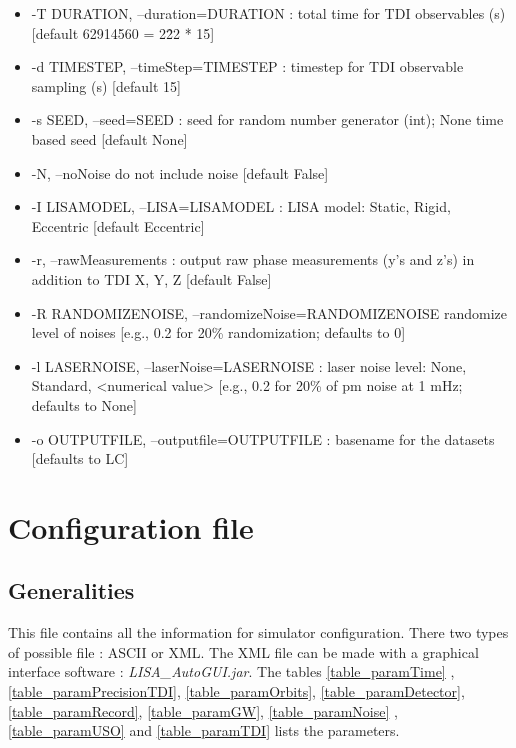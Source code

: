 \documentclass[a4paper,english,12pt]{article}
\begin{document}
\begin{itemize}
\item -T DURATION, --duration=DURATION : total time for TDI observables (s) [default 62914560 =  2\^ 22 * 15]
 \item -d TIMESTEP, --timeStep=TIMESTEP :    timestep for TDI observable sampling (s) [default 15]
 \item -s SEED, --seed=SEED  : seed for random number generator (int); None time based seed [default None]
 \item -N, --noNoise         do not include noise [default False]
 \item -I LISAMODEL, --LISA=LISAMODEL :  LISA model: Static, Rigid, Eccentric [default Eccentric]
 \item  -r, --rawMeasurements :  output raw phase measurements (y's and z's) in addition to TDI X, Y, Z [default False]
 \item  -R RANDOMIZENOISE, --randomizeNoise=RANDOMIZENOISE randomize level of noises [e.g., 0.2 for 20\% randomization; defaults to 0]
 \item  -l LASERNOISE, --laserNoise=LASERNOISE : laser noise level: None, Standard, <numerical value>  [e.g., 0.2 for 20\% of pm noise at 1 mHz; defaults to None]
 \item  -o OUTPUTFILE, --outputfile=OUTPUTFILE : basename for the datasets [defaults to LC]
\end{itemize}

\section{Configuration file}
\label{SConfigFile}

\subsection{Generalities}
\label{SSConfGen}
This file contains all the information for simulator configuration. There two types of possible file : ASCII or XML.  The XML file can be made with a graphical interface software : {\it LISA\_AutoGUI.jar}. The tables \ref{table_paramTime} , \ref{table_paramPrecisionTDI}, \ref{table_paramOrbits}, \ref{table_paramDetector}, \ref{table_paramRecord}, \ref{table_paramGW}, \ref{table_paramNoise} , \ref{table_paramUSO} and \ref{table_paramTDI}    lists the parameters.
\end{document}

